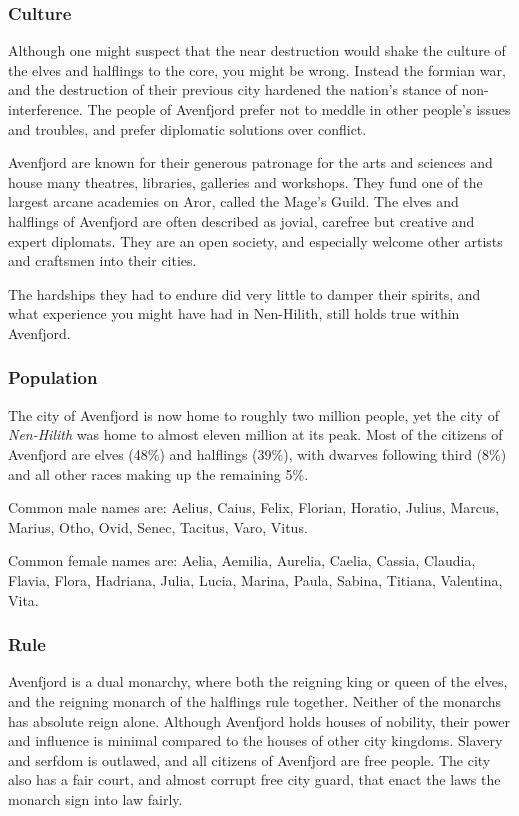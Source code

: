 
\subsubsection{Culture}

Although one might suspect that the near destruction would shake the culture
of the elves and halflings to the core, you might be wrong. Instead the
formian war, and the destruction of their previous city hardened the nation's
stance of non-interference. The people of Avenfjord prefer not to meddle in
other people's issues and troubles, and prefer diplomatic solutions over
conflict.

Avenfjord are known for their generous patronage for the arts and sciences and
house many theatres, libraries, galleries and workshops. They fund one of the
largest arcane academies on Aror, called the Mage's Guild. The elves and
halflings of Avenfjord are often described as jovial, carefree but creative
and expert diplomats. They are an open society, and especially welcome other
artists and craftsmen into their cities.

The hardships they had to endure did very little to damper their spirits, and
what experience you might have had in Nen-Hilith, still holds true within
Avenfjord.

\subsubsection{Population}

The city of Avenfjord is now home to roughly two million people, yet the city
of \emph{Nen-Hilith} was home to almost eleven million at its peak. Most of
the citizens of Avenfjord are elves (48\%) and halflings (39\%), with dwarves
following third (8\%) and all other races making up the remaining 5\%.

Common male names are: Aelius, Caius, Felix, Florian, Horatio, Julius, Marcus,
Marius, Otho, Ovid, Senec, Tacitus, Varo, Vitus.

Common female names are: Aelia, Aemilia, Aurelia, Caelia, Cassia, Claudia,
Flavia, Flora, Hadriana, Julia, Lucia, Marina, Paula, Sabina, Titiana,
Valentina, Vita.

\subsubsection{Rule}

Avenfjord is a dual monarchy, where both the reigning king or queen of the
elves, and the reigning monarch of the halflings rule together. Neither of
the monarchs has absolute reign alone. Although Avenfjord holds houses of
nobility, their power and influence is minimal compared to the houses of
other city kingdoms. Slavery and serfdom is outlawed, and all citizens of
Avenfjord are free people. The city also has a fair court, and almost corrupt
free city guard, that enact the laws the monarch sign into law fairly.

